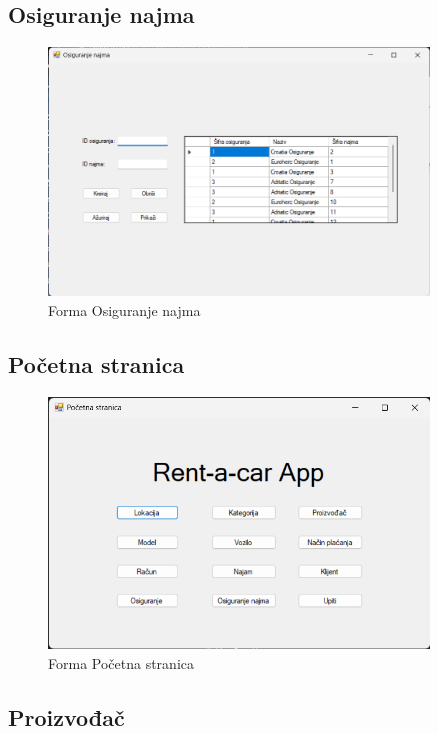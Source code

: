 \documentclass[]{foi} %
\begin{document}
\subsection{Osiguranje najma}

\begin{figure}[!ht]
    \centering
    \includegraphics[width=0.9\textwidth]{slike/osiguranjenajma.png}
    \caption{Forma Osiguranje najma}
    \label{fig:osiguranjenajma}
\end{figure}
\newpage

\subsection{Početna stranica}

\begin{figure}[!ht]
    \centering
    \includegraphics[width=0.9\textwidth]{slike/pocetna.png}
    \caption{Forma Početna stranica}
    \label{fig:pocetna}
\end{figure}

\subsection{Proizvođač}
\end{document}
